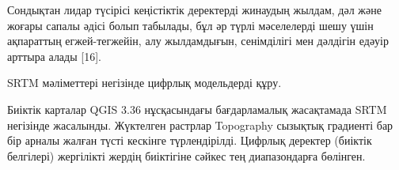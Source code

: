 
Сондықтан лидар түсірісі кеңістіктік деректерді жинаудың жылдам, дәл
және жоғары сапалы әдісі болып табылады, бұл әр түрлі мәселелерді шешу
үшін ақпараттың егжей-тегжейін, алу жылдамдығын, сенімділігі мен
дәлдігін едәуір арттыра алады {[}16{]}.

SRTM мәліметтері негізінде цифрлық модельдерді құру.

Биіктік карталар QGIS 3.36 нұсқасындағы бағдарламалық жасақтамада SRTM
негізінде жасалынды. Жүктелген растрлар Topography сызықтық градиенті
бар бір арналы жалған түсті кескінге түрлендірілді. Цифрлық деректер
(биіктік белгілері) жергілікті жердің биіктігіне сәйкес тең
диапазондарға бөлінген.

